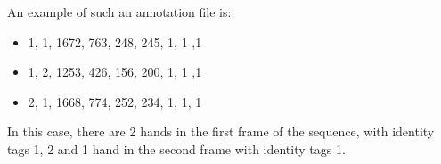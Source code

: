 An example of such an annotation file is:
\begin{itemize}
\item 1, 1, 1672, 763, 248, 245, 1, 1 ,1
\item 1, 2, 1253, 426, 156, 200, 1, 1 ,1
\item 2, 1, 1668, 774, 252, 234, 1, 1, 1
\end{itemize}
In this case, there are 2 hands in the first frame of the sequence, with identity tags 1, 2 and 1 hand in the second frame with identity tags 1.